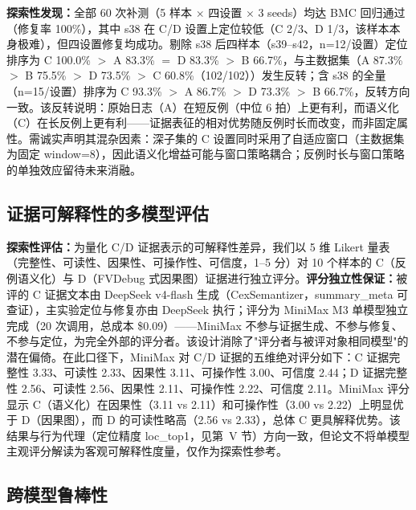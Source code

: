 \documentclass[journal]{IEEEtran}
\begin{document}
\textbf{探索性发现：}全部 60 次补测（5 样本 $\times$ 四设置 $\times$ 3 seeds）均达 BMC 回归通过（修复率 100\%），其中 s38 在 C/D 设置上定位较低（C 2/3、D 1/3，该样本本身极难），但四设置修复均成功。剔除 s38 后四样本（s39--s42，n=12/设置）定位排序为 C 100.0\% $>$ A 83.3\% $=$ D 83.3\% $>$ B 66.7\%，与主数据集（A 87.3\% $>$ B 75.5\% $>$ D 73.5\% $>$ C 60.8\%（102/102））发生反转；含 s38 的全量（n=15/设置）排序为 C 93.3\% $>$ A 86.7\% $>$ D 73.3\% $>$ B 66.7\%，反转方向一致。该反转说明：原始日志（A）在短反例（中位 6 拍）上更有利，而语义化（C）在长反例上更有利——证据表征的相对优势随反例时长而改变，而非固定属性。需诚实声明其混杂因素：深子集的 C 设置同时采用了自适应窗口（主数据集为固定 window=8），因此语义化增益可能与窗口策略耦合；反例时长与窗口策略的单独效应留待未来消融。

\subsection{证据可解释性的多模型评估}\label{sec:interp}

\textbf{探索性评估：}为量化 C/D 证据表示的可解释性差异，我们以 5 维 Likert 量表（完整性、可读性、因果性、可操作性、可信度，1--5 分）对 10 个样本的 C（反例语义化）与 D（FVDebug 式因果图）证据进行独立评分。\textbf{评分独立性保证：}被评的 C 证据文本由 DeepSeek v4-flash 生成（CexSemantizer，summary\_meta 可查证），主实验定位与修复亦由 DeepSeek 执行；评分为 MiniMax M3 单模型独立完成（20 次调用，总成本 \$0.09）——MiniMax 不参与证据生成、不参与修复、不参与定位，为完全外部的评分者。该设计消除了"评分者与被评对象相同模型"的潜在偏倚。在此口径下，MiniMax 对 C/D 证据的五维绝对评分如下：C 证据完整性 3.33、可读性 2.33、因果性 3.11、可操作性 3.00、可信度 2.44；D 证据完整性 2.56、可读性 2.56、因果性 2.11、可操作性 2.22、可信度 2.11。MiniMax 评分显示 C（语义化）在因果性（3.11 vs 2.11）和可操作性（3.00 vs 2.22）上明显优于 D（因果图），而 D 的可读性略高（2.56 vs 2.33），总体 C 更具解释优势。该结果与行为代理（定位精度 loc\_top1，见第~V 节）方向一致，但论文不将单模型主观评分解读为客观可解释性度量，仅作为探索性参考。


\subsection{跨模型鲁棒性}
\end{document}
